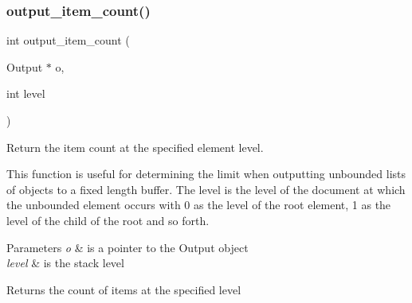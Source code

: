 \subsubsection{\texorpdfstring{output\+\_\+item\+\_\+count()}{output\_item\_count()}}
{\footnotesize\ttfamily int output\+\_\+item\+\_\+count (\begin{DoxyParamCaption}\item[{Output $\ast$}]{o,  }\item[{int}]{level }\end{DoxyParamCaption})}



Return the item count at the specified element level. 

This function is useful for determining the limit when outputting unbounded lists of objects to a fixed length buffer. The level is the level of the document at which the unbounded element occurs with 0 as the level of the root element, 1 as the level of the child of the root and so forth. 
\begin{DoxyParams}{Parameters}
{\em o} & is a pointer to the Output object \\
\hline
{\em level} & is the stack level \\
\hline
\end{DoxyParams}
\begin{DoxyReturn}{Returns}
the count of items at the specified level 
\end{DoxyReturn}
